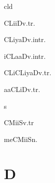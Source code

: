 \begin{multicols*}{2}
\begin{dictroot}{cl}{d}
    \begin{dictentry}{CLiiD}{v.tr.}
    \end{dictentry}
    \begin{dictentry}{CLiyaD}{v.intr.}
    \end{dictentry}
    \begin{dictentry}{iCLaaD}{v.intr.}
    \end{dictentry}
    \begin{dictentry}{CLiCLiyaD}{v.tr.}
    \end{dictentry}
    \begin{dictentry}{aaCLiD}{v.tr.}
    \end{dictentry}
\end{dictroot}

\begin{dictroot}{cm}{s}
    \begin{dictentry}{CMiiS}{v.tr}
    \end{dictentry}
    \begin{dictentry}{meCMiiS}{n.}
    \end{dictentry}
\end{dictroot}

\section*{D}


\end{multicols*}
